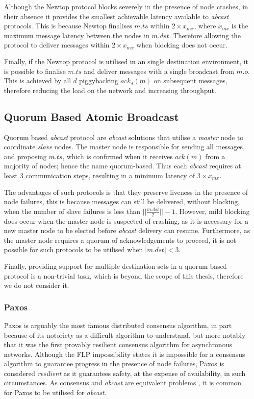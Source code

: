 Although the Newtop protocol blocks severely in the presence of node crashes, in their absence it provides the smallest achievable latency available to \emph{abcast} protocols.  This is because Newtop finalises $m.ts$ within $2 \times x_{mx}$, where $x_{mx}$ is the maximum message latency between the nodes in $m.dst$.  Therefore allowing the protocol to deliver messages within $2 \times x_{mx}$ when blocking does not occur.  

Finally, if the Newtop protocol is utilised in an single destination environment, it is possible to finalise $m.ts$ and deliver messages with a single broadcast from $m.o$.  This is achieved by all $d$ piggybacking $ack_d(m)$ on subsequent messages, therefore reducing the load on the network and increasing throughput.  

	\subsection{Quorum Based Atomic Broadcast}
	Quorum based \emph{abcast} protocol are \emph{abcast} solutions that utilise a \emph{master} node to coordinate \emph{slave} nodes.  The master node is responsible for sending all messages, and proposing $m.ts$, which is confirmed when it receives $ack(m)$ from a majority of nodes; hence the name quorum-based.  Thus each \emph{abcast} requires at least 3 communication steps, resulting in a minimum latency of $3 \times x_{mx}$.  
	
	The advantages of such protocols is that they preserve liveness in the presence of node failures, this is because messages can still be delivered, without blocking, when the number of slave failures is less than $\vert\vert \frac{m.dst}{2} \vert\vert - 1$.  However, mild blocking does occur when the master node is suspected of crashing, as it is necessary for a new master node to be elected before \emph{abcast} delivery can resume. Furthermore, as the master node requires a quorum of acknowledgements to proceed, it is not possible for such protocols to be utilised when $\left\vert m.dst \right\vert < 3$. 
	
	Finally, providing support for multiple destination sets in a quorum based protocol is a non-trivial task, which is beyond the scope of this thesis, therefore we do not consider it.  
	
		\subsubsection{Paxos}
		Paxos\citep{Lamport:1998:PP:279227.279229}\citep{Lamport:2001:PaxosMadeSimple} is arguably the most famous distributed consensus algorithm, in part because of its notoriety as a difficult algorithm to understand, but more notably that it was the first provably resilient consensus algorithm for asynchronous networks.  Although the FLP \citep{Fischer:1985:IDC:3149.214121} impossibility states it is impossible for a consensus algorithm to guarantee progress in the presence of node failures, Paxos is considered \emph{resilient} as it guarantees safety, at the expense of availability, in such circumstances.  As consensus and \emph{abcast} are equivalent problems \citep{Defago:2004:TOB:1041680.1041682}, it is common for Paxos to be utilised for \emph{abcast}.  
		
